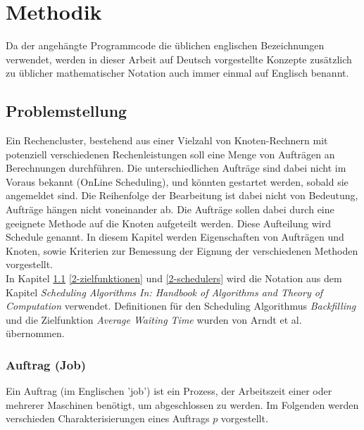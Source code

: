 \chapter{Methodik}
\label{chap:methodik}
Da der angehängte Programmcode die üblichen englischen Bezeichnungen verwendet, werden in dieser Arbeit auf Deutsch vorgestellte Konzepte zusätzlich zu üblicher mathematischer Notation auch immer einmal auf Englisch benannt.

\section{Problemstellung}
\label{2-problemstellung}

Ein Rechencluster, bestehend aus einer Vielzahl von Knoten-Rechnern mit potenziell verschiedenen Rechenleistungen soll eine Menge von Aufträgen an Berechnungen durchführen. Die unterschiedlichen Aufträge sind dabei nicht im Voraus bekannt (OnLine Scheduling), und könnten gestartet werden, sobald sie angemeldet sind. Die Reihenfolge der Bearbeitung ist dabei nicht von Bedeutung, Aufträge hängen nicht voneinander ab. Die Aufträge sollen dabei durch eine geeignete Methode auf die Knoten aufgeteilt werden. Diese Aufteilung wird Schedule genannt. In diesem Kapitel werden Eigenschaften von Aufträgen und Knoten, sowie Kriterien zur Bemessung der Eignung der verschiedenen Methoden vorgestellt.\\
In Kapitel \ref{2-problemstellung} \ref{2-zielfunktionen} und \ref{2-schedulers} wird die Notation aus dem Kapitel \emph{Scheduling Algorithms In: Handbook of Algorithms and Theory of Computation} 
\cite[p.~7-21]{Kar97} verwendet. Definitionen für den Scheduling Algorithmus \emph{Backfilling} und die Zielfunktion \emph{Average Waiting Time} wurden von Arndt et al. \cite[p. 96,98]{Arn99} übernommen.


\subsection{Auftrag (Job)}
Ein Auftrag (im Englischen 'job') ist ein Prozess, der Arbeitszeit einer oder mehrerer Maschinen benötigt, um abgeschlossen zu werden. Im Folgenden werden verschieden Charakterisierungen eines Auftrags $p$ vorgestellt.

